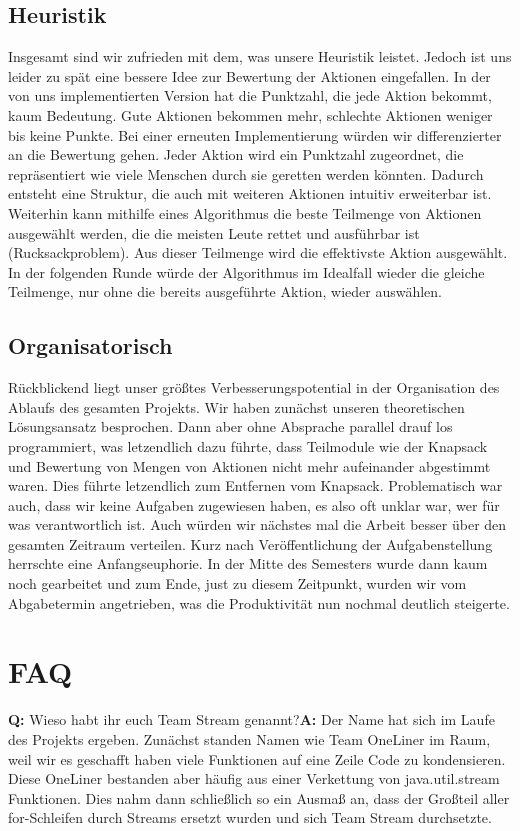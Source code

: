\documentclass{article}
\newcommand{\faqentry}[2]{\noindent\textbf{Q:} #1\newline\newline\textbf{A:} #2\newline\newline\newline} %
\newcommand{\gquote}[1]{\glqq #1\grqq} %
\begin{document}
\subsection{Heuristik}
Insgesamt sind wir zufrieden mit dem, was unsere Heuristik leistet. Jedoch ist uns leider zu spät eine bessere Idee zur Bewertung der Aktionen eingefallen. In der von uns implementierten Version hat die Punktzahl, die jede Aktion bekommt, kaum Bedeutung. Gute Aktionen bekommen mehr, schlechte Aktionen weniger bis keine Punkte. Bei einer erneuten Implementierung würden wir differenzierter an die Bewertung gehen. Jeder Aktion wird ein Punktzahl zugeordnet, die repräsentiert wie viele Menschen durch sie geretten werden könnten. Dadurch entsteht eine Struktur, die auch mit weiteren Aktionen intuitiv erweiterbar ist. Weiterhin kann mithilfe eines Algorithmus die beste Teilmenge von Aktionen ausgewählt werden, die die meisten Leute rettet und ausführbar ist (Rucksackproblem). Aus dieser Teilmenge wird die effektivste Aktion ausgewählt. In der folgenden Runde würde der Algorithmus im Idealfall wieder die gleiche Teilmenge, nur ohne die bereits ausgeführte Aktion, wieder auswählen.
\subsection{Organisatorisch}
Rückblickend liegt unser größtes Verbesserungspotential in der Organisation des Ablaufs des gesamten Projekts. Wir haben zunächst unseren theoretischen Lösungsansatz besprochen. Dann aber ohne Absprache parallel \gquote{drauf los programmiert}, was letzendlich dazu führte, dass Teilmodule wie der Knapsack und Bewertung von Mengen von Aktionen nicht mehr aufeinander abgestimmt waren. Dies führte letzendlich zum Entfernen vom Knapsack. Problematisch war auch, dass wir keine Aufgaben zugewiesen haben, es also oft unklar war, wer für was verantwortlich ist. Auch würden wir nächstes mal die Arbeit besser über den gesamten Zeitraum verteilen. Kurz nach Veröffentlichung der Aufgabenstellung herrschte eine Anfangseuphorie. In der Mitte des Semesters wurde dann kaum noch gearbeitet und zum Ende, just zu diesem Zeitpunkt, wurden wir vom Abgabetermin angetrieben, was die Produktivität nun nochmal deutlich steigerte.
\newpage
\section{FAQ}
\faqentry{Wieso habt ihr euch Team Stream genannt?}{Der Name hat sich im Laufe des Projekts ergeben. Zunächst standen Namen wie Team OneLiner im Raum, weil wir es geschafft haben viele Funktionen auf eine Zeile Code zu kondensieren. Diese \gquote{OneLiner} bestanden aber häufig aus einer Verkettung von java.util.stream Funktionen. Dies nahm dann schließlich so ein Ausmaß an, dass der Großteil aller for-Schleifen durch Streams ersetzt wurden und sich Team Stream durchsetzte.}
\end{document}
